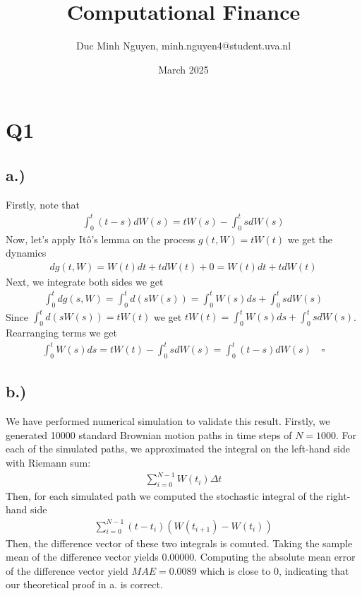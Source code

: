 \documentclass{article}
\title{Computational Finance}
\author{Duc Minh Nguyen, minh.nguyen4@student.uva.nl}
\date{March 2025}
\begin{document}
\maketitle

\section*{Q1}
\subsection*{a.)}
Firstly, note that 
\begin{align}
    \int_0^t (t-s) dW(s) = t W(s) - \int_0^t s dW(s)
\end{align}
Now, let's apply Itô's lemma on the process $g(t, W) = t W(t)$ we get the dynamics
\begin{align}
    dg(t, W) = W(t) dt + t dW(t)+ 0 = W(t)dt +tdW(t)
\end{align}
Next, we integrate both sides we get 
\begin{align}
   \int_0^t dg(s, W) = \int_0^t d(sW(s)) = \int_0^t W(s) ds + \int_0^t s dW(s)
\end{align}
Since $\int_0^t d(sW(s)) =tW(t)$ we get $ tW(t) = \int_0^t W(s) ds + \int_0^t s dW(s)$. Rearranging terms we get 
\begin{align}
    \int_0^t W(s) ds = tW(t) - \int_0^t s dW(s) = \int_0^t (t-s) dW(s) \quad \square
\end{align}

\subsection*{b.)}
We have performed numerical simulation to validate this result. Firstly, we generated 10000 standard Brownian motion paths in time steps of $N=1000$. For each of the simulated paths, we approximated the integral on the left-hand side with Riemann sum:
\begin{align}
    \sum_{i=0}^{N-1} W(t_i) \Delta t
\end{align}
Then, for each simulated path we computed the stochastic integral of the right-hand side
\begin{align}
    \sum_{i=0}^{N-1} (t - t_i) (W(t_{i+1}) - W(t_i))
\end{align}
Then, the difference vector of these two integrals is comuted. Taking the sample mean of the difference vector yields $0.00000$. Computing the absolute mean error of the difference vector yield $MAE = 0.0089$ which is close to $0$, indicating that our theoretical proof in a. is correct.
\end{document}
